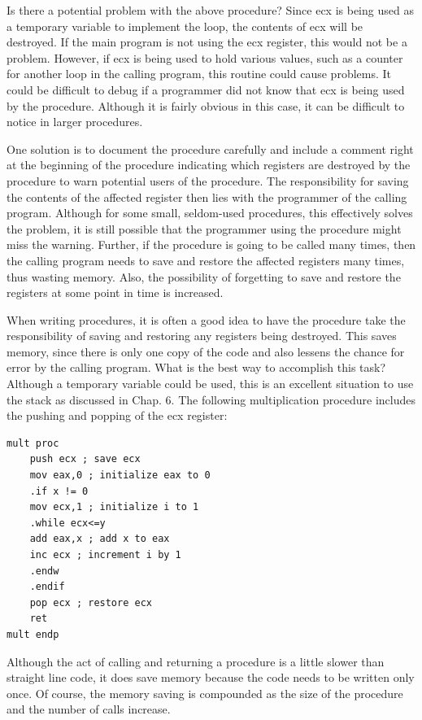 \documentclass[10pt]{article}
\begin{document}
Is there a potential problem with the above procedure? Since ecx is being used as a temporary variable to implement the loop, the contents of ecx will be destroyed. If the main program is not using the ecx register, this would not be a problem. However, if ecx is being used to hold various values, such as a counter for another loop in the calling program, this routine could cause problems. It could be difficult to debug if a programmer did not know that ecx is being used by the procedure. Although it is fairly obvious in this case, it can be difficult to notice in larger procedures.

One solution is to document the procedure carefully and include a comment right at the beginning of the procedure indicating which registers are destroyed by the procedure to warn potential users of the procedure. The responsibility for saving the contents of the affected register then lies with the programmer of the calling program. Although for some small, seldom-used procedures, this effectively solves the problem, it is still possible that the programmer using the procedure might miss the warning. Further, if the procedure is going to be called many times, then the calling program needs to save and restore the affected registers many times, thus wasting memory. Also, the possibility of forgetting to save and restore the registers at some point in time is increased.

When writing procedures, it is often a good idea to have the procedure take the responsibility of saving and restoring any registers being destroyed. This saves memory, since there is only one copy of the code and also lessens the chance for error by the calling program. What is the best way to accomplish this task? Although a temporary variable could be used, this is an excellent situation to use the stack as discussed in Chap. 6. The following multiplication procedure includes the pushing and popping of the ecx register:

\begin{verbatim}
mult proc
    push ecx ; save ecx
    mov eax,0 ; initialize eax to 0
    .if x != 0
    mov ecx,1 ; initialize i to 1
    .while ecx<=y
    add eax,x ; add x to eax
    inc ecx ; increment i by 1
    .endw
    .endif
    pop ecx ; restore ecx
    ret
mult endp
\end{verbatim}

Although the act of calling and returning a procedure is a little slower than straight line code, it does save memory because the code needs to be written only once. Of course, the memory saving is compounded as the size of the procedure and the number of calls increase.
\end{document}
